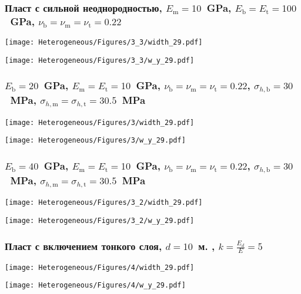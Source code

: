 \begin{frame}
    \frametitle{Пласт с сильной неоднородностью, $E_\text{m} = 10$~GPa, $E_\text{b} = E_\text{t} = 100$~GPa, $\nu_\text{b} = \nu_\text{m} = \nu_\text{t} = 0.22$}
    \begin{minipage}[t]{0.4\linewidth}
        \texttt{[image: Heterogeneous/Figures/3\_3/width\_29.pdf]}
    \end{minipage}
    \hfill
    \begin{minipage}[t]{0.57\linewidth}
        \texttt{[image: Heterogeneous/Figures/3\_3/w\_y\_29.pdf]}
    \end{minipage}
\end{frame}

\begin{frame}
    \frametitle{$E_\text{b} = 20$~GPa, $E_\text{m} = E_\text{t} = 10$~GPa, $\nu_\text{b} = \nu_\text{m} = \nu_\text{t} = 0.22$, $\sigma_{h,\text{b}} = 30$~MPa, $\sigma_{h,\text{m}} = \sigma_{h,\text{t}} = 30.5$~MPa}
    \begin{minipage}[t]{0.4\linewidth}
        \texttt{[image: Heterogeneous/Figures/3/width\_29.pdf]}
    \end{minipage}
    \hfill
    \begin{minipage}[t]{0.57\linewidth}
        \texttt{[image: Heterogeneous/Figures/3/w\_y\_29.pdf]}
    \end{minipage}
\end{frame}

\begin{frame}
    \frametitle{$E_\text{b} = 40$~GPa, $E_\text{m} = E_\text{t} = 10$~GPa, $\nu_\text{b} = \nu_\text{m} = \nu_\text{t} = 0.22$, $\sigma_{h,\text{b}} = 30$~MPa, $\sigma_{h,\text{m}} = \sigma_{h,\text{t}} = 30.5$~MPa}
    \begin{minipage}[t]{0.4\linewidth}
        \texttt{[image: Heterogeneous/Figures/3\_2/width\_29.pdf]}
    \end{minipage}
    \hfill
    \begin{minipage}[t]{0.57\linewidth}
        \texttt{[image: Heterogeneous/Figures/3\_2/w\_y\_29.pdf]}
    \end{minipage}
\end{frame}

\begin{frame}
    \frametitle{Пласт с включением тонкого слоя, $d=10$~м. , $k=\frac{E_d}{E}=5$}
    \begin{minipage}[t]{0.4\linewidth}
        \texttt{[image: Heterogeneous/Figures/4/width\_29.pdf]}
    \end{minipage}
    \hfill
    \begin{minipage}[t]{0.57\linewidth}
        \texttt{[image: Heterogeneous/Figures/4/w\_y\_29.pdf]}
    \end{minipage}
\end{frame}

